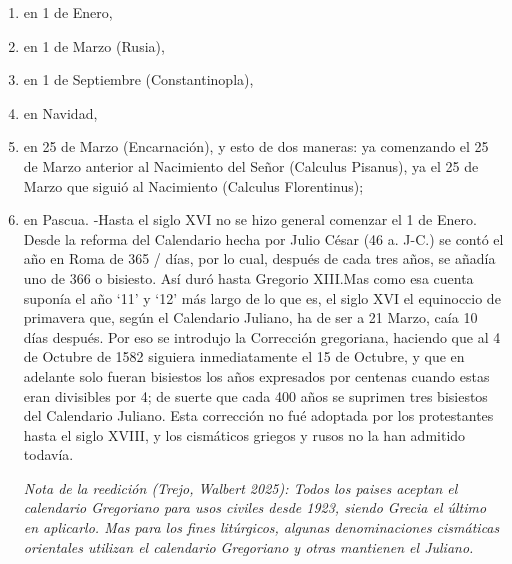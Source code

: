 \raggedbottom{} \documentclass[12pt, a4paper, openany]{book} %
\begin{document}
\begin{enumerate}
\begin{enumerate}
\begin{enumerate}
                  \item en 1 de Enero,
                  \item en 1 de Marzo (Rusia),
                  \item en 1 de Septiembre (Constantinopla),
                  \item en Navidad,
                  \item en 25 de Marzo (Encarnación), y esto de dos maneras: ya comenzando el 25 de Marzo anterior al Nacimiento del Señor (Calculus Pisanus), ya el 25 de Marzo que siguió al Nacimiento (Calculus Florentinus);
                  \item en Pascua. -Hasta el siglo XVI no se hizo general comenzar el 1 de Enero. Desde la reforma del Calendario hecha por Julio César (46 a. J-C.) se contó el año en Roma de 365 / días, por lo cual, después de cada tres años, se añadía uno de 366 o bisiesto. Así duró hasta Gregorio XIII.\@ Mas como esa cuenta suponía el año `11' y `12' más largo de lo que es, el siglo XVI el equinoccio de primavera que, según el Calendario Juliano, ha de ser a 21 Marzo, caía 10 días después. Por eso se introdujo la Corrección gregoriana, haciendo que al 4 de Octubre de 1582 siguiera inmediatamente el 15 de Octubre, y que en adelante solo fueran bisiestos los años expresados por centenas cuando estas eran divisibles por 4; de suerte que cada 400 años se suprimen tres bisiestos del Calendario Juliano. Esta corrección no fué adoptada por los protestantes hasta el siglo XVIII, y los cismáticos griegos y rusos no la han admitido todavía.

                        \textit{Nota de la reedición (Trejo, Walbert 2025): Todos los paises aceptan el calendario Gregoriano para usos civiles desde 1923, siendo Grecia el último en aplicarlo. Mas para los fines litúrgicos, algunas denominaciones cismáticas orientales utilizan el calendario Gregoriano y otras mantienen el Juliano.}
                \end{enumerate}
        \end{enumerate}
\end{enumerate}
\end{document}
